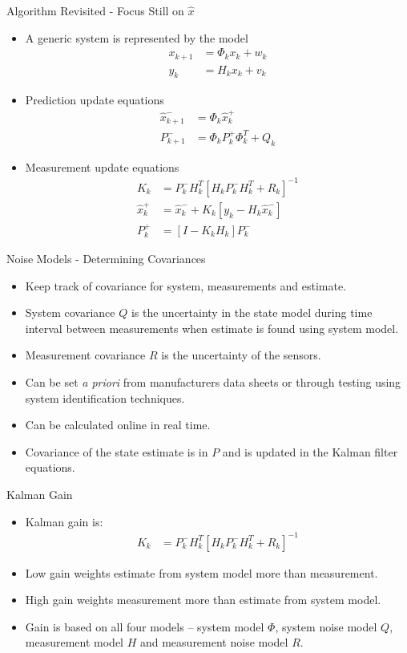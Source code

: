 \documentclass[hyperref={pdfpagelabels=false}]{beamer}
\begin{document}
\begin{frame}{Algorithm Revisited - Focus Still on $\hat{x}$}
\begin{itemize}
\item A generic system is represented by the model
\begin{align*}
x_{k+1} &= \Phi_kx_k + w_k \\
y_k &= H_kx_k + v_k
\end{align*}
\item Prediction update equations
\begin{align*}
\hat{x}_{k+1}^- &= \Phi_k\hat{x}_k^+ \\
P_{k+1}^- &= \Phi_kP_k^+\Phi_k^T + Q_k
\end{align*}
\item Measurement update equations
\begin{align*}
K_k &= P_k^-H_k^T\left[H_kP_k^-H_k^T + R_k\right]^{-1} \\
\hat{x}_k^+ &= \hat{x}_k^- + K_k\left[y_k - H_k\hat{x}_k^-\right] \\
P_k^+ &= \left[I - K_kH_k\right]P_k^-
\end{align*}
\end{itemize}
\end{frame}

\begin{frame}{Noise Models - Determining Covariances}
\begin{itemize}
\item Keep track of covariance for system, measurements and estimate.
\item System covariance $Q$ is the uncertainty in the state model during time interval between measurements when estimate is found using system model.
\item Measurement covariance $R$ is the uncertainty of the sensors.
\item Can be set \textit{a priori} from manufacturers data sheets or through testing using system identification techniques.
\item Can be calculated online in real time.
\item Covariance of the state estimate is in $P$ and is updated in the Kalman filter equations.
\end{itemize}
\end{frame}

\begin{frame}{Kalman Gain}
\begin{itemize}
\item Kalman gain is:
\begin{align*}
K_k &= P_k^-H_k^T\left[H_kP_k^-H_k^T + R_k\right]^{-1}
\end{align*}
\item Low gain weights estimate from system model more than measurement.
\item High gain weights measurement more than estimate from system model.
\item Gain is based on all four models -- system model $\Phi$, system noise model $Q$, measurement model $H$ and measurement noise model $R$.
\end{itemize}
\end{frame}
\end{document}
